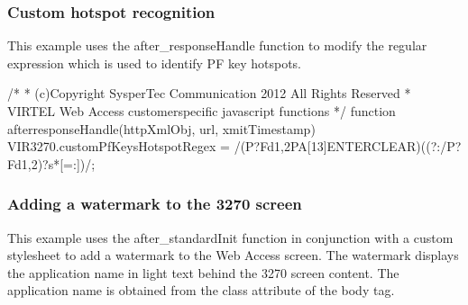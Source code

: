 \documentclass[letterpaper,10pt,english]{sphinxmanual}
\begin{document}
\subsubsection{Custom hotspot recognition}
\label{\detokenize{User_Guide:custom-hotspot-recognition}}
This example uses the after\_responseHandle function to modify the regular expression which is used to identify PF key hotspots.

\begin{sphinxVerbatim}[commandchars=\\\{\}]
/*
* (c)Copyright SysperTec Communication 2012 All Rights Reserved
* VIRTEL Web Access customer\PYGZhy{}specific javascript functions
*/
function after\PYGZus{}responseHandle(httpXmlObj, url, xmitTimestamp) \PYGZob{}
VIR3270.customPfKeysHotspotRegex =
/(P?F\PYGZbs{}d\PYGZob{}1,2\PYGZcb{}\textbar{}PA[1\PYGZhy{}3]\textbar{}ENTER\textbar{}CLEAR)((?:\PYGZbs{}/P?F\PYGZbs{}d\PYGZob{}1,2\PYGZcb{})?\PYGZbs{}s*[=:\PYGZhy{}])/;
\PYGZcb{}
\end{sphinxVerbatim}



\subsubsection{Adding a watermark to the 3270 screen}
\label{\detokenize{User_Guide:adding-a-watermark-to-the-3270-screen}}
This example uses the after\_standardInit function in conjunction with a custom stylesheet to add a watermark to the Web Access screen. The watermark displays the application name in light text behind the 3270 screen content. The application name is obtained from the class attribute of the body tag.

\begin{sphinxVerbatim}[commandchars=\\\{\}]
       
      
  
   
  
  
\end{sphinxVerbatim}
\end{document}
